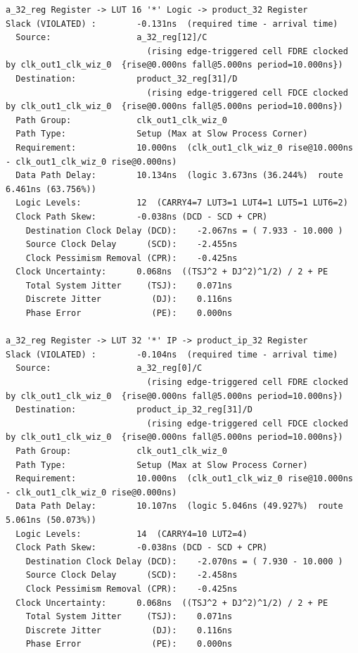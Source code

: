 \documentclass{report}
\begin{document}
\begin{verbatim}
a_32_reg Register -> LUT 16 '*' Logic -> product_32 Register
Slack (VIOLATED) :        -0.131ns  (required time - arrival time)
  Source:                 a_32_reg[12]/C
                            (rising edge-triggered cell FDRE clocked by clk_out1_clk_wiz_0  {rise@0.000ns fall@5.000ns period=10.000ns})
  Destination:            product_32_reg[31]/D
                            (rising edge-triggered cell FDCE clocked by clk_out1_clk_wiz_0  {rise@0.000ns fall@5.000ns period=10.000ns})
  Path Group:             clk_out1_clk_wiz_0
  Path Type:              Setup (Max at Slow Process Corner)
  Requirement:            10.000ns  (clk_out1_clk_wiz_0 rise@10.000ns - clk_out1_clk_wiz_0 rise@0.000ns)
  Data Path Delay:        10.134ns  (logic 3.673ns (36.244%)  route 6.461ns (63.756%))
  Logic Levels:           12  (CARRY4=7 LUT3=1 LUT4=1 LUT5=1 LUT6=2)
  Clock Path Skew:        -0.038ns (DCD - SCD + CPR)
    Destination Clock Delay (DCD):    -2.067ns = ( 7.933 - 10.000 ) 
    Source Clock Delay      (SCD):    -2.455ns
    Clock Pessimism Removal (CPR):    -0.425ns
  Clock Uncertainty:      0.068ns  ((TSJ^2 + DJ^2)^1/2) / 2 + PE
    Total System Jitter     (TSJ):    0.071ns
    Discrete Jitter          (DJ):    0.116ns
    Phase Error              (PE):    0.000ns

a_32_reg Register -> LUT 32 '*' IP -> product_ip_32 Register
Slack (VIOLATED) :        -0.104ns  (required time - arrival time)
  Source:                 a_32_reg[0]/C
                            (rising edge-triggered cell FDRE clocked by clk_out1_clk_wiz_0  {rise@0.000ns fall@5.000ns period=10.000ns})
  Destination:            product_ip_32_reg[31]/D
                            (rising edge-triggered cell FDCE clocked by clk_out1_clk_wiz_0  {rise@0.000ns fall@5.000ns period=10.000ns})
  Path Group:             clk_out1_clk_wiz_0
  Path Type:              Setup (Max at Slow Process Corner)
  Requirement:            10.000ns  (clk_out1_clk_wiz_0 rise@10.000ns - clk_out1_clk_wiz_0 rise@0.000ns)
  Data Path Delay:        10.107ns  (logic 5.046ns (49.927%)  route 5.061ns (50.073%))
  Logic Levels:           14  (CARRY4=10 LUT2=4)
  Clock Path Skew:        -0.038ns (DCD - SCD + CPR)
    Destination Clock Delay (DCD):    -2.070ns = ( 7.930 - 10.000 ) 
    Source Clock Delay      (SCD):    -2.458ns
    Clock Pessimism Removal (CPR):    -0.425ns
  Clock Uncertainty:      0.068ns  ((TSJ^2 + DJ^2)^1/2) / 2 + PE
    Total System Jitter     (TSJ):    0.071ns
    Discrete Jitter          (DJ):    0.116ns
    Phase Error              (PE):    0.000ns

\end{verbatim}
\end{document}
